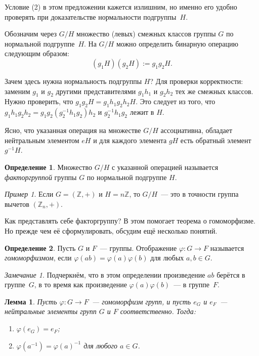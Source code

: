 \documentclass[a4paper,10pt]{amsart}
\def\ZZ{{\mathbb Z}}%
\newtheorem{lemma}{Лемма}
\theoremstyle{definition}
\newtheorem{definition}{Определение}
\theoremstyle{remark}
\newtheorem{remark}{Замечание}
\newtheorem{example}{Пример}
\begin{document}
Условие (2) в этом предложении кажется излишним, но именно его
удобно проверять при доказательстве нормальности подгруппы~$H$.

Обозначим через $G/H$ множество (левых) смежных классов группы $G$
по нормальной подгруппе~$H$. На $G/H$ можно определить бинарную
операцию следующим образом:
$$
(g_1H)(g_2H):=g_1g_2H.
$$

Зачем здесь нужна нормальность подгруппы $H$? Для проверки
корректности: заменим $g_1$ и $g_2$ другими представителями $g_1h_1$
и $g_2h_2$ тех же смежных классов. Нужно проверить, что
$g_1g_2H=g_1h_1g_2h_2H$. Это следует из того, что
$g_1h_1g_2h_2=g_1g_2(g_2^{-1}h_1g_2)h_2$ и $g_2^{-1}h_1g_2$ лежит в
$H$.

Ясно, что указанная операция на множестве $G/H$ ассоциативна,
обладает нейтральным элементом $eH$ и для каждого элемента $gH$ есть
обратный элемент $g^{-1}H$.

\begin{definition}
Множество $G/H$ с указанной операцией называется {\it факторгруппой}
группы $G$ по нормальной подгруппе $H$.
\end{definition}

\begin{example}
Если $G=(\ZZ,+)$ и $H=n\ZZ$, то $G/H$~--- это в точности группа
вычетов $(\ZZ_n,+)$.
\end{example}

Как представлять себе факторгруппу? В этом помогает теорема о
гомоморфизме. Но прежде чем её сформулировать, обсудим ещё несколько
понятий.

\begin{definition}
Пусть $G$ и $F$~--- группы. Отображение $\varphi\colon G\to F$
называется {\it гомоморфизмом}, если
$\varphi(ab)=\varphi(a)\varphi(b)$ для любых $a,b\in G$.
\end{definition}

\begin{remark}
Подчеркнём, что в этом определении произведение $ab$ берётся в
группе~$G$, в то время как произведение $\varphi(a) \varphi(b)$~---
в группе~$F$.
\end{remark}

\begin{lemma}
Пусть $\varphi \colon G \to F$~--- гомоморфизм групп, и пусть $e_G$
и $e_F$~--- нейтральные элементы групп $G$ и $F$ соответственно.
Тогда:

\vspace{-2mm}
\begin{enumerate}
\item[(а)]
$\varphi(e_G) = e_F$;

\item[(б)]
$\varphi(a^{-1})=\varphi(a)^{-1}$ для любого $a\in G$.
\end{enumerate}
\end{lemma}
\end{document}
